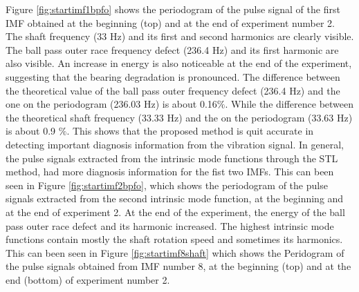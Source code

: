 \documentclass[../Main/thesis.tex]{subfiles}
\begin{document}
\justify
Figure \ref{fig:startimf1bpfo} shows the periodogram of the pulse signal of the first IMF obtained at the beginning (top) and at the end of experiment number 2. The shaft frequency (33 Hz) and its first and second harmonics are clearly visible.
The ball pass outer race frequency defect (236.4 Hz) and its first harmonic are also visible. An increase in energy is also noticeable at the end of the experiment, suggesting that the bearing degradation is pronounced.
\justify
The difference between the theoretical value of the ball pass outer frequency defect (236.4 Hz) and the one on the periodogram (236.03 Hz) is about 0.16$\%$. While the difference between the theoretical shaft frequency (33.33 Hz) and the on the periodogram (33.63 Hz) is about 0.9 $\%$. This shows that the proposed method is quit accurate in detecting important diagnosis information from the vibration signal.
\justify
In general, the pulse signals extracted from the intrinsic mode functions through the STL method, had more diagnosis information for the fist two IMFs. This can been seen in Figure \ref{fig:startimf2bpfo}, which shows the periodogram of the pulse signals extracted from the second intrinsic mode function, at the beginning and at the end of experiment 2. At the end of the experiment, the energy of the ball pass outer race defect and its harmonic increased.
\justify
The highest intrinsic mode functions contain mostly the shaft rotation speed and sometimes its harmonics. This can been seen in Figure \ref{fig:startimf8shaft} which shows the Peridogram of the pulse signals obtained from IMF number 8, at the beginning (top) and at the end (bottom) of experiment number 2.
\end{document}
